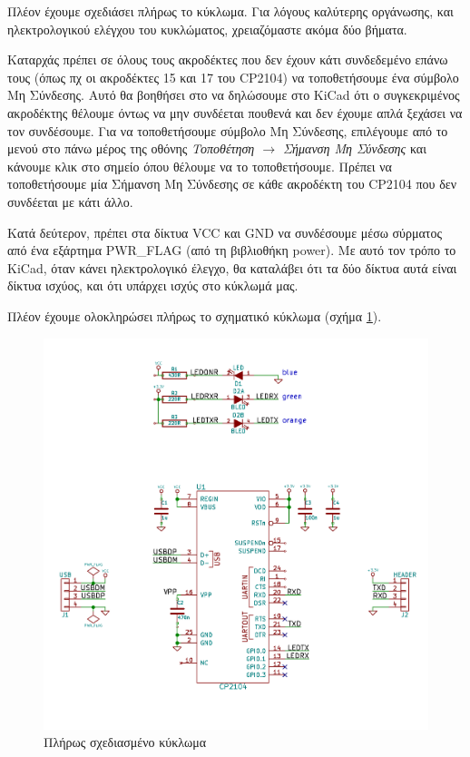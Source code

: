 \documentclass[a4paper]{article}
\begin{document}
Πλέον έχουμε σχεδιάσει πλήρως το κύκλωμα. Για λόγους καλύτερης οργάνωσης, και ηλεκτρολογικού ελέγχου του κυκλώματος, χρειαζόμαστε ακόμα δύο βήματα.

Καταρχάς πρέπει σε όλους τους ακροδέκτες που δεν έχουν κάτι συνδεδεμένο επάνω τους (όπως πχ οι ακροδέκτες 15 και 17 του CP2104) να τοποθετήσουμε ένα σύμβολο Μη Σύνδεσης. Αυτό θα βοηθήσει στο να δηλώσουμε στο \textenglish{KiCad} ότι ο συγκεκριμένος ακροδέκτης θέλουμε όντως να μην συνδέεται πουθενά και δεν έχουμε απλά ξεχάσει να τον συνδέσουμε. Για να τοποθετήσουμε σύμβολο Μη Σύνδεσης, επιλέγουμε από το μενού στο πάνω μέρος της οθόνης \textit{Τοποθέτηση $\rightarrow$ Σήμανση Μη Σύνδεσης} και κάνουμε κλικ στο σημείο όπου θέλουμε να το τοποθετήσουμε. Πρέπει να τοποθετήσουμε μία Σήμανση Μη Σύνδεσης σε κάθε ακροδέκτη του CP2104 που δεν συνδέεται με κάτι άλλο.

Κατά δεύτερον, πρέπει στα δίκτυα VCC και GND να συνδέσουμε μέσω σύρματος από ένα εξάρτημα PWR\_FLAG (από τη βιβλιοθήκη power). Με αυτό τον τρόπο το \textenglish{KiCad}, όταν κάνει ηλεκτρολογικό έλεγχο, θα καταλάβει ότι τα δύο δίκτυα αυτά είναι δίκτυα ισχύος, και ότι υπάρχει ισχύς στο κύκλωμά μας.

Πλέον έχουμε ολοκληρώσει πλήρως το σχηματικό κύκλωμα (σχήμα \ref{fig:eesch-schem-final2}).

\begin{figure}
  \begin{center}
    \includegraphics[width=.9\textwidth]{img/eesch-schem-final.png}
    \caption{Πλήρως σχεδιασμένο κύκλωμα}
    \label{fig:eesch-schem-final2}
  \end{center}
\end{figure}
\end{document}
